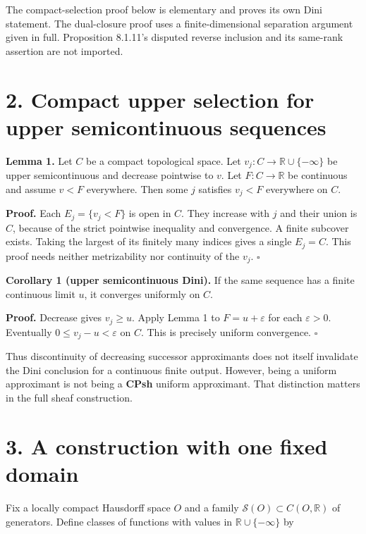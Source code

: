 \documentclass[
  11pt,
]{article}
\begin{document}
The compact-selection proof below is elementary and proves its own Dini
statement. The dual-closure proof uses a finite-dimensional separation
argument given in full. Proposition 8.1.11's disputed reverse inclusion
and its same-rank assertion are not imported.

\section{2. Compact upper selection for upper semicontinuous
sequences}\label{compact-upper-selection-for-upper-semicontinuous-sequences}

\textbf{Lemma 1.} Let \(C\) be a compact topological space. Let
\(v_j:C\to\mathbb R\cup\{-\infty\}\) be upper semicontinuous and
decrease pointwise to \(v\). Let \(F:C\to\mathbb R\) be continuous and
assume \(v<F\) everywhere. Then some \(j\) satisfies \(v_j<F\)
everywhere on \(C\).

\textbf{Proof.} Each \(E_j=\{v_j<F\}\) is open in \(C\). They increase
with \(j\) and their union is \(C\), because of the strict pointwise
inequality and convergence. A finite subcover exists. Taking the largest
of its finitely many indices gives a single \(E_j=C\). This proof needs
neither metrizability nor continuity of the \(v_j\). \(\square\)

\textbf{Corollary 1 (upper semicontinuous Dini).} If the same sequence
has a finite continuous limit \(u\), it converges uniformly on \(C\).

\textbf{Proof.} Decrease gives \(v_j\geq u\). Apply Lemma 1 to
\(F=u+\varepsilon\) for each \(\varepsilon>0\). Eventually
\(0\leq v_j-u<\varepsilon\) on \(C\). This is precisely uniform
convergence. \(\square\)

Thus discontinuity of decreasing successor approximants does not itself
invalidate the Dini conclusion for a continuous finite output. However,
being a uniform approximant is not being a \textbf{CPsh} uniform
approximant. That distinction matters in the full sheaf construction.

\section{3. A construction with one fixed
domain}\label{a-construction-with-one-fixed-domain}

Fix a locally compact Hausdorff space \(O\) and a family
\(\mathcal S(O)\subset C(O,\mathbb R)\) of generators. Define classes of
functions with values in \(\mathbb R\cup\{-\infty\}\) by
\end{document}
